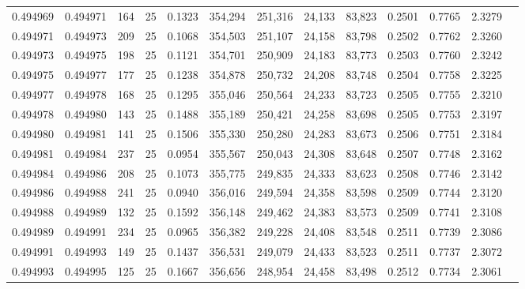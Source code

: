 \begin{tabular}{rrrrrrrrrrrrr}
0.494969 & 0.494971 &   164 &  25 &                                     0.1323 & 354,294 & 251,316 &  24,133 &  83,823 & 0.2501 & 0.7765 & 2.3279 \\
0.494971 & 0.494973 &   209 &  25 &                                     0.1068 & 354,503 & 251,107 &  24,158 &  83,798 & 0.2502 & 0.7762 & 2.3260 \\
0.494973 & 0.494975 &   198 &  25 &                                     0.1121 & 354,701 & 250,909 &  24,183 &  83,773 & 0.2503 & 0.7760 & 2.3242 \\
0.494975 & 0.494977 &   177 &  25 &                                     0.1238 & 354,878 & 250,732 &  24,208 &  83,748 & 0.2504 & 0.7758 & 2.3225 \\
0.494977 & 0.494978 &   168 &  25 &                                     0.1295 & 355,046 & 250,564 &  24,233 &  83,723 & 0.2505 & 0.7755 & 2.3210 \\
0.494978 & 0.494980 &   143 &  25 &                                     0.1488 & 355,189 & 250,421 &  24,258 &  83,698 & 0.2505 & 0.7753 & 2.3197 \\
0.494980 & 0.494981 &   141 &  25 &                                     0.1506 & 355,330 & 250,280 &  24,283 &  83,673 & 0.2506 & 0.7751 & 2.3184 \\
0.494981 & 0.494984 &   237 &  25 &                                     0.0954 & 355,567 & 250,043 &  24,308 &  83,648 & 0.2507 & 0.7748 & 2.3162 \\
0.494984 & 0.494986 &   208 &  25 &                                     0.1073 & 355,775 & 249,835 &  24,333 &  83,623 & 0.2508 & 0.7746 & 2.3142 \\
0.494986 & 0.494988 &   241 &  25 &                                     0.0940 & 356,016 & 249,594 &  24,358 &  83,598 & 0.2509 & 0.7744 & 2.3120 \\
0.494988 & 0.494989 &   132 &  25 &                                     0.1592 & 356,148 & 249,462 &  24,383 &  83,573 & 0.2509 & 0.7741 & 2.3108 \\
0.494989 & 0.494991 &   234 &  25 &                                     0.0965 & 356,382 & 249,228 &  24,408 &  83,548 & 0.2511 & 0.7739 & 2.3086 \\
0.494991 & 0.494993 &   149 &  25 &                                     0.1437 & 356,531 & 249,079 &  24,433 &  83,523 & 0.2511 & 0.7737 & 2.3072 \\
0.494993 & 0.494995 &   125 &  25 &                                     0.1667 & 356,656 & 248,954 &  24,458 &  83,498 & 0.2512 & 0.7734 & 2.3061 \\

\end{tabular}
